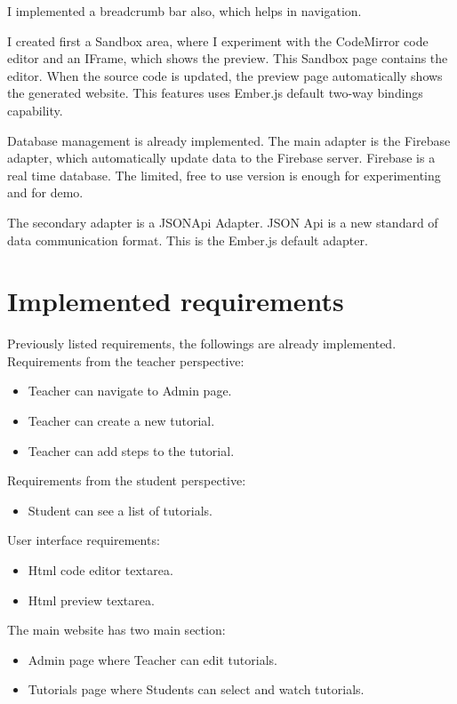 \documentclass[11pt
              , a4paper
              , twoside
              , openright
              ]{report}
\begin{document}
I implemented a breadcrumb bar also, which helps in navigation.

I created first a Sandbox area, where I experiment with the CodeMirror code editor and an IFrame, which shows the preview. This Sandbox page contains the editor. When the source code is updated, the preview page automatically shows the generated website. This features uses Ember.js default two-way bindings capability.

Database management is already implemented. The main adapter is the Firebase adapter, which automatically update data to the Firebase server. Firebase is a real time database. The limited, free to use version is enough for experimenting and for demo.

The secondary adapter is a JSONApi Adapter. JSON Api \cite{jsonapi} is a new standard of data communication format. This is the Ember.js default adapter.

\section{Implemented requirements}

Previously listed requirements, the followings are already implemented. \\

\noindent Requirements from the teacher perspective:
\begin{itemize}[noitemsep]
\item {} Teacher can navigate to Admin page.
\item {} Teacher can create a new tutorial.
\item {} Teacher can add steps to the tutorial.
\end{itemize}

\noindent Requirements from the student perspective:
\begin{itemize}[noitemsep]
\item {} Student can see a list of tutorials.
\end{itemize}

\noindent User interface requirements:
\begin{itemize}[noitemsep]
\item {} Html code editor textarea.
\item {} Html preview textarea.
\end{itemize}

\noindent The main website has two main section:
\begin{itemize}
\item {} Admin page where Teacher can edit tutorials.
\item {} Tutorials page where Students can select and watch tutorials.
\end{itemize}
\end{document}
